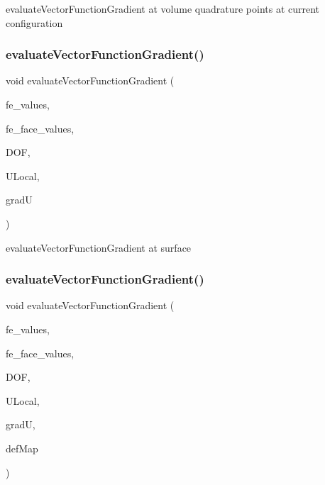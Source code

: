 evaluate\+Vector\+Function\+Gradient at volume quadrature points at current configuration \mbox{\label{group___evaluation_functions_gab2771d18ff704decbbc12ca2b848bbfe}} 
\subsubsection{\texorpdfstring{evaluateVectorFunctionGradient()}{evaluateVectorFunctionGradient()}\hspace{0.1cm}{\footnotesize\ttfamily [3/4]}}
{\footnotesize\ttfamily void evaluate\+Vector\+Function\+Gradient (\begin{DoxyParamCaption}\item[{const F\+E\+Values$<$ dim $>$ \&}]{fe\+\_\+values,  }\item[{const F\+E\+Face\+Values$<$ dim $>$ \&}]{fe\+\_\+face\+\_\+values,  }\item[{unsigned int}]{D\+OF,  }\item[{Table$<$ 1, T $>$ \&}]{U\+Local,  }\item[{Table$<$ 3, T $>$ \&}]{gradU }\end{DoxyParamCaption})}

evaluate\+Vector\+Function\+Gradient at surface \mbox{\label{group___evaluation_functions_ga9608539d601a91aff1ba01ccc720fbe0}} 
\subsubsection{\texorpdfstring{evaluateVectorFunctionGradient()}{evaluateVectorFunctionGradient()}\hspace{0.1cm}{\footnotesize\ttfamily [4/4]}}
{\footnotesize\ttfamily void evaluate\+Vector\+Function\+Gradient (\begin{DoxyParamCaption}\item[{const F\+E\+Values$<$ dim $>$ \&}]{fe\+\_\+values,  }\item[{const F\+E\+Face\+Values$<$ dim $>$ \&}]{fe\+\_\+face\+\_\+values,  }\item[{unsigned int}]{D\+OF,  }\item[{Table$<$ 1, T $>$ \&}]{U\+Local,  }\item[{Table$<$ 3, T $>$ \&}]{gradU,  }\item[{\mbox{\hyperlink{structdeformation_map}{deformation\+Map}}$<$ T, dim $>$ \&}]{def\+Map }\end{DoxyParamCaption})}

